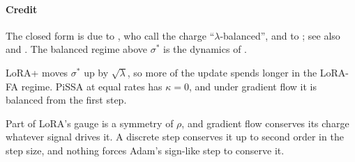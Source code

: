 \paragraph{Credit}
The closed form is due to \citet{xtarmoun2021understanding}, who call the charge ``$\lambda$-balanced'', and to
\citet{xmin2021explicit}; see also \citet{xdomine2025lazy} and \citet{xkunin2024get}. The balanced regime above
$\sigma^*$ is the dynamics of \citet{arora2018optimization}.

\begin{explains}
LoRA+ moves $\sigma^*$ up by $\sqrt\lambda$, so more of the update spends longer in the LoRA-FA regime. PiSSA at equal
rates has $\kappa=0$, and under gradient flow it is balanced from the first step.
\end{explains}

Part of LoRA's gauge is a symmetry of $\rho$, and gradient flow conserves its charge whatever signal drives it. A
discrete step conserves it up to second order in the step size, and nothing forces Adam's sign-like step to conserve it.

